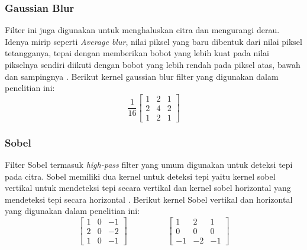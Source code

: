 \subsubsection{Gaussian Blur}
Filter ini juga digunakan untuk menghaluskan citra dan mengurangi derau. Idenya mirip seperti \textit{Average blur}, nilai piksel yang baru dibentuk dari nilai piksel tetangganya, tepai dengan memberikan bobot yang lebih kuat pada nilai pikselnya sendiri diikuti dengan bobot yang lebih rendah pada piksel atas, bawah dan sampingnya . Berikut kernel gaussian blur filter yang digunakan dalam penelitian ini:
\begin{equation}
    \label{kernel:gaussianblur}
    \frac{1}{16}
    \left[
    \begin{matrix}
 1 & 2 & 1 \\
 2 & 4 & 2 \\
 1 & 2 & 1
    \end{matrix}
    \right]
\end{equation}

\subsubsection{Sobel}
Filter Sobel termasuk \textit{high-pass} filter yang umum digunakan untuk deteksi tepi pada citra. Sobel memiliki dua kernel untuk deteksi tepi yaitu kernel sobel vertikal untuk mendeteksi tepi secara vertikal dan kernel sobel horizontal yang mendeteksi tepi secara horizontal . Berikut kernel Sobel vertikal dan horizontal yang digunakan dalam penelitian ini:
\begin{equation}
    \label{kernel:sobel}
    \left[
    \begin{matrix}
 1 & 0 & -1 \\
 2 & 0 & -2 \\
 1 & 0 & -1
    \end{matrix}
    \right]
    \hspace{2cm}
    \left[
 \begin{matrix}
 1 & 2 & 1 \\
 0 & 0 & 0 \\
 -1 & -2 & -1
    \end{matrix}
    \right]
\end{equation}

